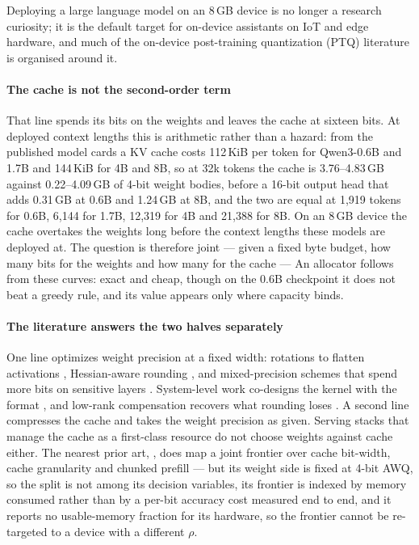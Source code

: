 \documentclass[10pt,journal]{IEEEtran}
\newcommand{\rhoSym}{\rho}
\begin{document}
Deploying a large language model on an 8\,GB device is no longer a research
curiosity; it is the default target for on-device assistants on IoT and edge
hardware, and much of the on-device post-training quantization (PTQ)
literature is organised around it.

\paragraph*{The cache is not the second-order term}
That line spends its bits on the weights and leaves the cache at sixteen bits. At deployed context lengths this is
arithmetic rather than a hazard: from the published model cards a KV cache costs
112\,KiB per token for Qwen3-0.6B and 1.7B and 144\,KiB for 4B and 8B, so at 32k
tokens the cache is 3.76--4.83\,GB against 0.22--4.09\,GB of 4-bit weight bodies, before a 16-bit output head that
adds 0.31\,GB at 0.6B and 1.24\,GB at 8B, and
the two are equal at 1{,}919 tokens for 0.6B, 6{,}144 for 1.7B, 12{,}319 for 4B
and 21{,}388 for 8B. On an 8\,GB device the cache overtakes the weights long
before the context lengths these models are deployed at. The question is
therefore joint --- given a fixed byte budget, how many bits for the weights and
how many for the cache --- An allocator follows from these curves: exact and cheap, though on the 0.6B
checkpoint it does not beat a greedy rule, and its value appears only where
capacity binds.

\paragraph*{The literature answers the two halves separately}
One line optimizes weight precision at a fixed width: rotations to flatten
activations \cite{quarot,spinquant,duquant,sun2024}, Hessian-aware rounding
\cite{gptq,frantar2022}, and mixed-precision schemes that spend more bits on
sensitive layers \cite{hawqv2,mixllm,gamma,alignquant,wang2018}. System-level
work co-designs the kernel with the format
\cite{lin2024,zhao2023,wei2024,guo2026,mixquant}, and low-rank compensation
recovers what rounding loses \cite{song2026,park2026,liu2025}. A second line
compresses the cache \cite{kivi,kvquant,mixkvq,kvpareto,duanmu2024,su2025,he2024}
and takes the weight precision as given. Serving stacks that manage the cache as
a first-class resource \cite{kwon2023} do not choose weights against cache
either. The nearest prior art, \cite{kvpareto}, does map a joint frontier over
cache bit-width, cache granularity and chunked prefill --- but its weight side is
fixed at 4-bit AWQ, so the split is not among its decision variables, its
frontier is indexed by memory consumed rather than by a per-bit accuracy cost
measured end to end, and it reports no usable-memory fraction for its hardware,
so the frontier cannot be re-targeted to a device with a different $\rhoSym$.
\end{document}
